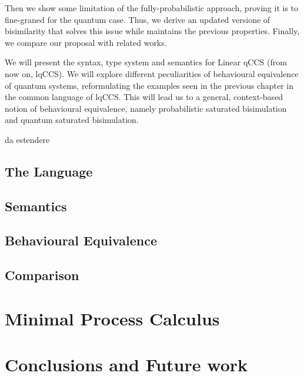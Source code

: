\documentclass[10pt,a4paper, titlepage]{report}
\newcommand{\note}[1]{{\color{red} #1}}
\theoremstyle{remark}
\begin{document}
Then we show some limitation of the fully-probabilistic approach, proving it is to fine-graned for the quantum case. Thus, we derive an updated versione of bisimilarity that solves this issue while maintains the previous properties. Finally, we compare our proposal with related works.




We will present the syntax, type system and semantics for Linear qCCS (from now on, lqCCS). We will explore different peculiarities of behavioural equivalence of quantum systems, reformulating the examples seen in the previous chapter in the common language of lqCCS. This will lead us to a general, context-based notion of behavioural equivalence, namely probabilistic saturated bisimulation and quantum saturated bisimulation.

\note{da estendere}

\section{The Language}


\section{Semantics}





\section{Behavioural Equivalence}\label{bisimulation_chapter4}





\section{Comparison}




\chapter{Minimal Process Calculus}


\chapter{Conclusions and Future work}

\printbibliography[
heading=bibintoc,
title={Bibliography}
]
\end{document}
